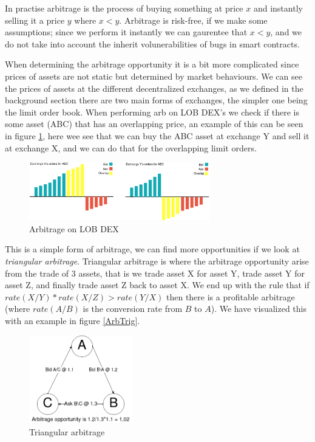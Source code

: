 In practise arbitrage is the process of buying something at price $x$ and instantly selling it a price $y$ where $x<y$. Arbitrage is risk-free, if we make some assumptions; since we perform it instantly we can gaurentee that $x<y$, and we do not take into account the inherit volunerabilities of bugs in smart contracts.

When determining the arbitrage opportunity it is a bit more complicated since prices of assets are not static but determined by market behaviours. We can see the prices of assets at the different decentralized exchanges, as we defined in the background section there are two main forms of exchanges, the simpler one being the limit order book. When performing arb on LOB DEX's we check if there is some asset (ABC) that has an overlapping price, an example of this can be seen in figure \ref{fig:ArbLOB}, here wee see that we can buy the ABC asset at exchange Y and sell it at exchange X, and we can do that for the overlapping limit orders. 
\begin{figure}[h]
\centering
\includegraphics[width=0.7\textwidth]{assests/Flash-loans-Arbitrage-Overlap-1}
\caption{Arbitrage on LOB DEX}
\label{fig:ArbLOB}
\end{figure}
This is a simple form of arbitrage, we can find more opportunities if we look at \textit{triangular arbitrage}. Triangular arbitrage is where the arbitrage opportunity arise from the trade of 3 assets, that is we trade asset X for asset Y, trade asset Y for asset Z, and finally trade asset Z back to asset X. We end up with the rule that if $rate(X/Y)*rate(X/Z)>rate(Y/X)$ then there is a profitable arbitrage (where $rate(A/B)$ is the conversion rate from $B$ to $A$). We have visualized this with an example in figure \ref{ArbTrig}.
\begin{figure}[h]
\centering
\includegraphics[width=0.4\textwidth]{assests/Flash-loans-Arbitrage-triangular}
\caption{Triangular arbitrage}
\label{fig:ArbTrig}
\end{figure}